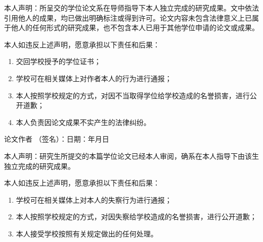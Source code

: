 
\fancyfoot[LE,RO]{}

\begin{center}\xiaowu\end{center}\vspace{-7mm}
\begin{center}\end{center}

本人声明：所呈交的学位论文系在导师指导下本人独立完成的研究成果。文中依法引用他人的成果，均已做出明确标注或得到许可。论文内容未包含法律意义上已属于他人的任何形式的研究成果，也不包含本人已用于其他学位申请的论文或成果。

本人如违反上述声明，愿意承担以下责任和后果：
\begin{enumerate}
	\item 交回学校授予的学位证书；
	\item 学校可在相关媒体上对作者本人的行为进行通报；
	\item 本人按照学校规定的方式，对因不当取得学位给学校造成的名誉损害，进行公开道歉；
	\item 本人负责因论文成果不实产生的法律纠纷。
\end{enumerate}

\vspace{1em}
论文作者 （签名）：\hfill 日期：\hspace{4em}年\hspace{3em}月\hspace{3em}日\hspace{4em}


\vspace{1em}
\begin{center}\end{center}

本人声明：研究生\underline{\quad\quad\quad}所提交的本篇学位论文已经本人审阅，确系在本人指导下由该生独立完成的研究成果。

本人如违反上述声明，愿意承担以下责任和后果：
\begin{enumerate}
	\item 学校可在相关媒体上对本人的失察行为进行通报；
	\item 本人按照学校规定的方式，对因失察给学校造成的名誉损害，进行公开道歉；
	\item 本人接受学校按照有关规定做出的任何处理。
\end{enumerate}

